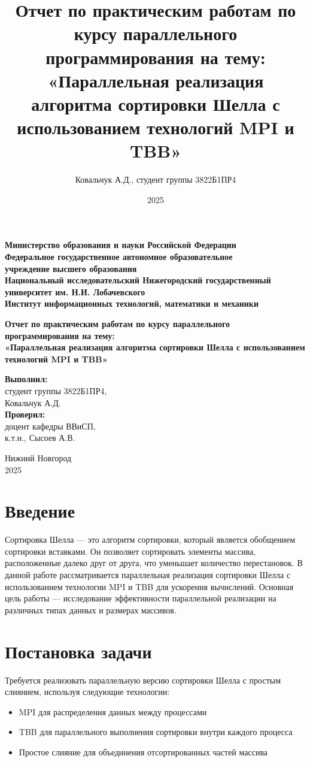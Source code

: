 \documentclass[12pt]{article}
\title{Отчет по практическим работам по курсу параллельного программирования на тему:\\[20pt]
«Параллельная реализация алгоритма сортировки Шелла с использованием технологий MPI и TBB»}
\author{Ковальчук А.Д., студент группы 3822Б1ПР4}
\date{2025}
\begin{document}
\sloppy

\begin{titlepage}
    \centering
    \textbf{Министерство образования и науки Российской Федерации\\[5pt]
    Федеральное государственное автономное образовательное\\
    учреждение высшего образования\\
    Национальный исследовательский Нижегородский государственный университет им. Н.И. Лобачевского\\[10pt]
    Институт информационных технологий, математики и механики}\\[30pt]

    \vfill

    \textbf{\Large Отчет по практическим работам по курсу параллельного программирования на тему:\\[20pt]
    «Параллельная реализация алгоритма сортировки Шелла с использованием технологий MPI и TBB»}\\[70pt]

    \hfill\parbox{0.35\textwidth}{
        \textbf{Выполнил:}\\
        студент группы 3822Б1ПР4,\\
        Ковальчук А.Д.\\[10pt]
        \textbf{Проверил:}\\
        доцент кафедры ВВиСП,\\
        к.т.н., Сысоев А.В.\\
    }

    \vfill

    Нижний Новгород\\
    2025
\end{titlepage}

\tableofcontents
\newpage

\section{Введение}
Сортировка Шелла — это алгоритм сортировки, который является обобщением сортировки вставками. Он позволяет сортировать элементы массива, расположенные далеко друг от друга, что уменьшает количество перестановок. В данной работе рассматривается параллельная реализация сортировки Шелла с использованием технологии MPI и TBB для ускорения вычислений. Основная цель работы — исследование эффективности параллельной реализации на различных типах данных и размерах массивов.

\section{Постановка задачи}
Требуется реализовать параллельную версию сортировки Шелла с простым слиянием, используя следующие технологии:
\begin{itemize}
\item MPI для распределения данных между процессами
\item TBB для параллельного выполнения сортировки внутри каждого процесса
\item Простое слияние для объединения отсортированных частей массива
\end{itemize}
\end{document}
